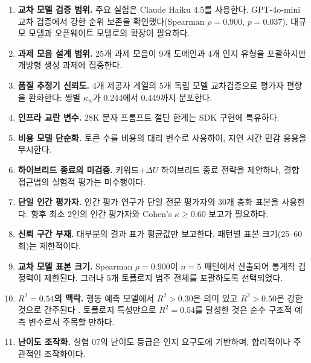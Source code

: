 \begin{enumerate}
\item \textbf{교차 모델 검증 범위.} 주요 실험은 Claude Haiku 4.5를 사용한다. GPT-4o-mini 교차 검증에서 강한 순위 보존을 확인했다(Spearman $\rho = 0.900$, $p = 0.037$). 대규모 모델과 오픈웨이트 모델로의 확장이 필요하다.

\item \textbf{과제 모음 설계 범위.} 25개 과제 모음이 9개 도메인과 4개 인지 유형을 포괄하지만 개방형 생성 과제에 집중한다.

\item \textbf{품질 추정기 신뢰도.} 4개 제공자 계열의 5개 독립 모델 교차검증으로 평가자 편향을 완화한다: 쌍별 $\kappa_w$가 0.244에서 0.449까지 분포한다.

\item \textbf{인프라 교란 변수.} 28K 문자 프롬프트 절단 한계는 SDK 구현에 특유하다.

\item \textbf{비용 모델 단순화.} 토큰 수를 비용의 대리 변수로 사용하여, 지연 시간 민감 응용을 무시한다.

\item \textbf{하이브리드 종료의 미검증.} 키워드+$\Delta U$ 하이브리드 종료 전략을 제안하나, 결합 접근법의 실험적 평가는 미수행이다.

\item \textbf{단일 인간 평가자.} 인간 평가 연구가 단일 전문 평가자의 30개 층화 표본을 사용한다. 향후 최소 2인의 인간 평가자와 Cohen's $\kappa \geq 0.60$ 보고가 필요하다.

\item \textbf{신뢰 구간 부재.} 대부분의 결과 표가 평균값만 보고한다. 패턴별 표본 크기(25--60회)는 제한적이다.

\item \textbf{교차 모델 표본 크기.} Spearman $\rho = 0.900$이 $n = 5$ 패턴에서 산출되어 통계적 검정력이 제한된다. 그러나 5개 토폴로지 범주 전체를 포괄하도록 선택되었다.

\item \textbf{$R^{2}=0.54$의 맥락.} 행동 예측 모델에서 $R^{2}>0.30$은 의미 있고 $R^{2}>0.50$은 강한 것으로 간주된다 \citep{cohen1988}. 토폴로지 특성만으로 $R^{2}=0.54$를 달성한 것은 순수 구조적 예측 변수로서 주목할 만하다.

\item \textbf{난이도 조작화.} 실험 07의 난이도 등급은 인지 요구도에 기반하며, 합리적이나 주관적인 조작화이다.
\end{enumerate}

